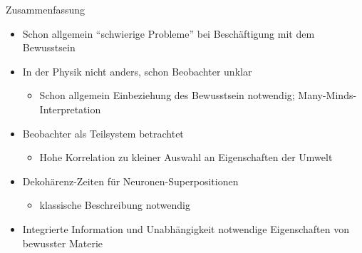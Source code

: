 \begin{frame}{Zusammenfassung}
	\begin{itemize}
		\item{Schon allgemein \enquote{schwierige Probleme} bei
			  Beschäftigung mit dem Bewusstsein}
		\item{In der Physik nicht anders, schon Beobachter unklar}
			\begin{itemize}
				\item{Schon allgemein Einbeziehung des Bewusstsein notwendig;
					  Many-Minds-Interpretation}
			\end{itemize}
		\item{Beobachter als Teilsystem betrachtet}
			\begin{itemize}
				\item{Hohe Korrelation zu kleiner Auswahl an Eigenschaften der Umwelt}
			\end{itemize}
		\item{Dekohärenz-Zeiten für Neuronen-Superpositionen}
					\begin{itemize}
						\item{klassische Beschreibung notwendig}
					\end{itemize}
		\item{Integrierte Information und Unabhängigkeit notwendige Eigenschaften von
			  bewusster Materie}
	\end{itemize}
\end{frame}